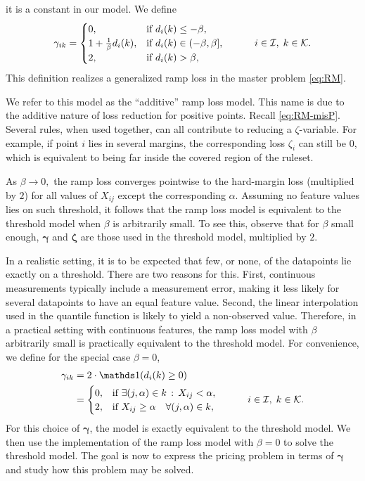 it is a constant in our model.
We define
\begin{equation}\label{eq:gamma_ik}
    \gamma_{ik} = \begin{cases}
                      0, & \text{if $d_i(k) \leq -\beta$}, \\
                      1 + \frac{1}{\beta}d_i(k), & \text{if $d_{i}(k) \in (-\beta, \beta]$}, \\
                      2, & \text{if $d_i(k) > \beta$},
    \end{cases} \quad \quad \quad i \in \mathcal{I}, \; k \in \mathcal{K}.
\end{equation}
This definition realizes a generalized ramp loss in the master problem \eqref{eq:RM}.

We refer to this model as the ``additive'' ramp loss model.
This name is due to the additive nature of loss reduction for positive points.
Recall \eqref{eq:RM-misP}.
Several rules, when used together, can all contribute to reducing a $\zeta$-variable.
For example, if point $i$ lies in several margins, the corresponding loss $\zeta_i$ can still be $0$,
which is equivalent to being far inside the covered region of the ruleset.


As $\beta \to 0,$ the ramp loss converges pointwise to the hard-margin loss (multiplied by $2$)
for all values of $X_{ij}$ except the corresponding $\alpha$.
Assuming no feature values lies on such threshold,
it follows that the ramp loss model is equivalent to the threshold model when $\beta$ is arbitrarily small.
To see this, observe that for $\beta$ small enough, $\bm{\gamma}$ and $\bm{\zeta}$ are those used in
the threshold model, multiplied by $2$.

In a realistic setting, it is to be expected that few, or none, of the datapoints lie exactly on a threshold.
There are two reasons for this.
First, continuous measurements typically include a measurement error,
making it less likely for several datapoints to have an equal feature value.
Second, the linear interpolation used in the quantile function is likely to yield a non-observed value.
Therefore, in a practical setting with continuous features,
the ramp loss model with $\beta$ arbitrarily small is practically equivalent to the threshold model.
For convenience, we define for the special case $\beta = 0$,
\begin{equation}\label{eq:ramp_gamma_mw_0}
    \begin{split}
        \gamma_{ik} &= 2 \cdot \Ind(d_i(k) \geq 0) \\
        &=
        \begin{cases}
            0, & \text{if $\exists (j,\alpha)\in k \fw X_{ij} < \alpha$},\\
            2, & \text{if $X_{ij} \geq \alpha \quad \forall (j,\alpha) \in k$},\\
        \end{cases} \tquad i \in \I, \; k \in \K.
    \end{split}
\end{equation}
For this choice of $\bm{\gamma}$, the model is exactly equivalent to the threshold model.
We then use the implementation of the ramp loss model with $\beta = 0$ to solve the threshold model.
The goal is now to express the pricing problem in terms of $\bm{\gamma}$ and study how this problem may be solved.